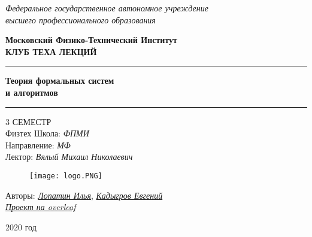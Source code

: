 \begin{titlepage}
	\clearpage\thispagestyle{empty}
	\centering
	
	\textit{Федеральное государственное автономное учреждение \\
		высшего профессионального образования}
	\vspace{0.5ex}
	
	\textbf{Московский Физико-Технический Институт \\ КЛУБ ТЕХА ЛЕКЦИЙ}
	\vspace{20ex}
	
	\rule{\linewidth}{0.5mm}
	{\textbf{Теория формальных систем}}
	\\
	{\textbf{и алгоритмов}}
	\rule{\linewidth}{0.5mm}
	
	3 СЕМЕСТР
	\\
	Физтех Школа: \textit{ФПМИ}
	\\
	Направление: \textit{МФ}
	\\
	Лектор: \textit{Вялый Михаил Николаевич}
	\vspace{1ex}
	
	\begin{figure}[!ht]
		\centering
		\texttt{[image: logo.PNG]}
	\end{figure}
	
\begin{flushright}
	\noindent
	Авторы: \href{https://vk.com/ilia.lopatin}{ \textit{Лопатин Илья}},
	\href{https://vk.com/id95939286}{ \textit{Кадыгров Евгений}}
	\\
	\href{https://www.overleaf.com/read/gymvmctzvdgd}{\textit{Проект на overleaf}}

\end{flushright}
	
	\vfill
	2020 год
	\pagebreak
	
\end{titlepage}

